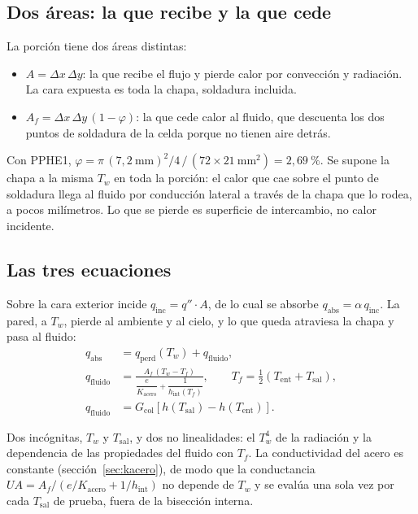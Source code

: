 \documentclass[11pt,a4paper]{article}
\begin{document}
\subsection{Dos áreas: la que recibe y la que cede}
\label{sec:soldaduras}

La porción tiene dos áreas distintas:
\begin{itemize}
  \item $A = \Delta x\,\Delta y$: la que recibe el flujo y pierde calor por
        convección y radiación. La cara expuesta es toda la chapa, soldadura
        incluida.
  \item $A_f = \Delta x\,\Delta y\,(1 - \varphi)$: la que cede calor al fluido,
        que descuenta los dos puntos de soldadura de la celda porque no tienen aire
        detrás.
\end{itemize}
Con PPHE1, $\varphi = \pi\,(7{,}2~\mathrm{mm})^2/4\,/\,(72\times21~\mathrm{mm^2})
= 2{,}69~\%$. Se supone la chapa a la misma $T_w$ en toda la porción: el calor
que cae sobre el punto de soldadura llega al fluido por conducción lateral a
través de la chapa que lo rodea, a pocos milímetros. Lo que se pierde es
superficie de intercambio, no calor incidente.

\subsection{Las tres ecuaciones}

Sobre la cara exterior incide $q_{\mathrm{inc}} = q''\!\cdot\!A$, de lo cual se
absorbe $q_{\mathrm{abs}} = \alpha\,q_{\mathrm{inc}}$. La pared, a $T_w$, pierde
al ambiente y al cielo, y lo que queda atraviesa la chapa y pasa al fluido:
\begin{align}
  q_{\mathrm{abs}} &= q_{\mathrm{perd}}(T_w) + q_{\mathrm{fluido}}, \label{eq:bal}\\[2pt]
  q_{\mathrm{fluido}} &= \frac{A_f\,(T_w - T_f)}
       {\dfrac{e}{K_{\mathrm{acero}}} + \dfrac{1}{h_{\mathrm{int}}(T_f)}},
  \qquad T_f = \tfrac{1}{2}\left(T_{\mathrm{ent}} + T_{\mathrm{sal}}\right), \label{eq:cond}\\[2pt]
  q_{\mathrm{fluido}} &= G_{\mathrm{col}}\left[h(T_{\mathrm{sal}}) - h(T_{\mathrm{ent}})\right].
  \label{eq:ent}
\end{align}

Dos incógnitas, $T_w$ y $T_{\mathrm{sal}}$, y dos no linealidades: el $T_w^4$ de
la radiación y la dependencia de las propiedades del fluido con $T_f$. La
conductividad del acero es constante (sección~\ref{sec:kacero}), de modo que la
conductancia $UA = A_f/(e/K_{\mathrm{acero}} + 1/h_{\mathrm{int}})$ no depende de
$T_w$ y se evalúa una sola vez por cada $T_{\mathrm{sal}}$ de prueba, fuera de la
bisección interna.
\end{document}
